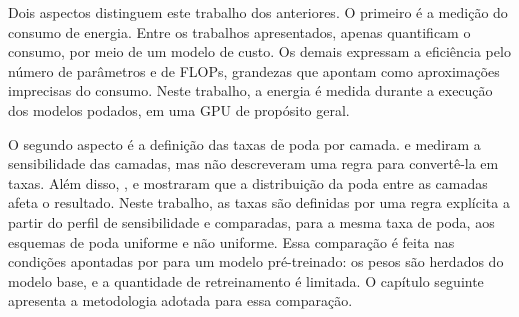Dois aspectos distinguem este trabalho dos anteriores. O primeiro é a medição do consumo de
energia. Entre os trabalhos apresentados, apenas  quantificam o consumo,
por meio de um modelo de custo. Os demais expressam a eficiência pelo número de parâmetros e de
FLOPs, grandezas que  apontam como aproximações imprecisas do consumo.
Neste trabalho, a energia é medida durante a execução dos modelos podados, em uma GPU de
propósito geral.

O segundo aspecto é a definição das taxas de poda por camada.  e
 mediram a sensibilidade das camadas, mas não descreveram uma regra para
convertê-la em taxas. Além disso, ,  e
 mostraram que a distribuição da poda entre as camadas afeta o
resultado. Neste trabalho, as taxas são definidas por uma regra explícita a partir do perfil de
sensibilidade e comparadas, para a mesma taxa de poda, aos esquemas de poda uniforme e não
uniforme. Essa comparação é feita nas condições apontadas por  para um
modelo pré-treinado: os pesos são herdados do modelo base, e a quantidade de retreinamento é
limitada. O capítulo seguinte apresenta a metodologia adotada para essa comparação.
